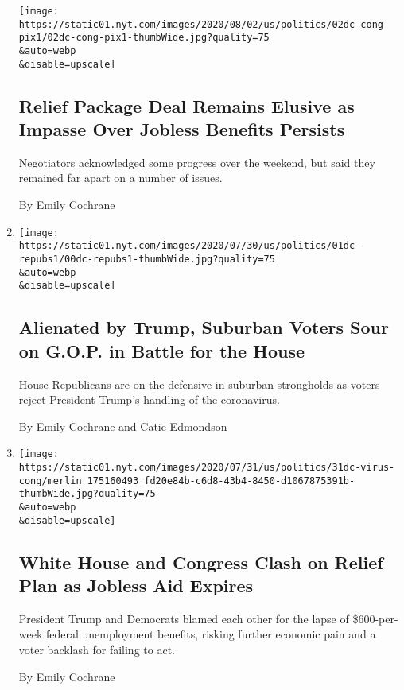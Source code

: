 \begin{enumerate}
  \texttt{[image: https://static01.nyt.com/images/2020/08/02/us/politics/02dc-cong-pix1/02dc-cong-pix1-thumbWide.jpg?quality=75\\\&auto=webp\\\&disable=upscale]}

  \hypertarget{relief-package-deal-remains-elusive-as-impasse-over-jobless-benefits-persists}{%
  \subsection{Relief Package Deal Remains Elusive as Impasse Over
  Jobless Benefits
  Persists}\label{relief-package-deal-remains-elusive-as-impasse-over-jobless-benefits-persists}}

  Negotiators acknowledged some progress over the weekend, but said they
  remained far apart on a number of issues.

  By Emily Cochrane
\item
  \href{/2020/08/01/us/politics/trump-suburban-voters-republicans-house.html}{}

  \texttt{[image: https://static01.nyt.com/images/2020/07/30/us/politics/01dc-repubs1/00dc-repubs1-thumbWide.jpg?quality=75\\\&auto=webp\\\&disable=upscale]}

  \hypertarget{alienated-by-trump-suburban-voters-sour-on-gop-in-battle-for-the-house}{%
  \subsection{Alienated by Trump, Suburban Voters Sour on G.O.P. in
  Battle for the
  House}\label{alienated-by-trump-suburban-voters-sour-on-gop-in-battle-for-the-house}}

  House Republicans are on the defensive in suburban strongholds as
  voters reject President Trump's handling of the coronavirus.

  By Emily Cochrane and Catie Edmondson
\item
  \href{/2020/07/31/us/politics/white-house-congress-relief-plan-jobless-aid.html}{}

  \texttt{[image: https://static01.nyt.com/images/2020/07/31/us/politics/31dc-virus-cong/merlin\_175160493\_fd20e84b-c6d8-43b4-8450-d1067875391b-thumbWide.jpg?quality=75\\\&auto=webp\\\&disable=upscale]}

  \hypertarget{white-house-and-congress-clash-on-relief-plan-as-jobless-aid-expires}{%
  \subsection{White House and Congress Clash on Relief Plan as Jobless
  Aid
  Expires}\label{white-house-and-congress-clash-on-relief-plan-as-jobless-aid-expires}}

  President Trump and Democrats blamed each other for the lapse of
  \$600-per-week federal unemployment benefits, risking further economic
  pain and a voter backlash for failing to act.

  By Emily Cochrane
\end{enumerate}

